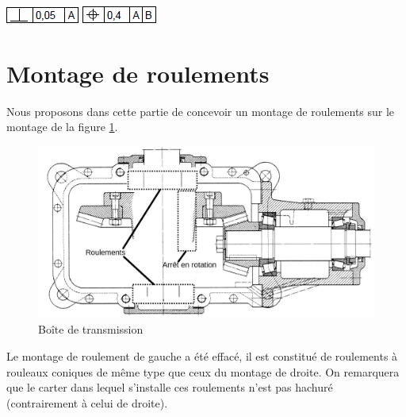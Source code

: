 

\begin{center}
 \includegraphics[width=0.2\linewidth]{img/specif1} \hspace{2cm} \includegraphics[width=0.2\linewidth]{img/specif2}
\end{center}

\section{Montage de roulements}

Nous proposons dans cette partie de concevoir un montage de roulements sur le montage de la figure \ref{fig20}.

\begin{figure}[!ht]\begin{center}
 \includegraphics[width=\linewidth]{img/montage_roulements_sujet}
 \caption{Boîte de transmission}
 \label{fig20}
\end{center}\end{figure}


Le montage de roulement de gauche a été effacé, il est constitué de roulements à rouleaux coniques de même type que ceux du montage de droite. On remarquera que le carter dans lequel s'installe ces roulements n'est pas hachuré (contrairement à celui de droite).

